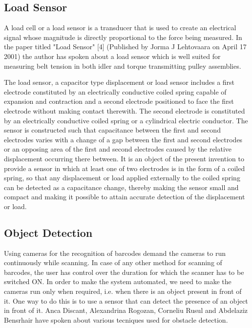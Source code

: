 \documentclass[times, 1pt, a4paper]{article}
\begin{document}
\subsection{Load Sensor} \label{subsection:load_sensor}

A load cell or a load sensor is a transducer that is used to create an electrical signal whose magnitude is directly proportional to the force being measured. In the paper titled "Load Sensor" [4] (Published by Jorma J Lehtovaara on April 17 2001) the author has spoken about a load sensor which is well suited for measuring belt tension in both idler and torque transmitting pulley assemblies. 

The load sensor, a capacitor type displacement or load sensor includes a first electrode constituted by an electrically conductive coiled spring capable of expansion and contraction and a second electrode positioned to face the first electrode without making contact therewith. The second electrode is constituted by an electrically conductive coiled spring or a cylindrical electric conductor. The sensor is constructed such that capacitance between the first and second electrodes varies with a change of a gap between the first and second electrodes or an opposing area of the first and second electrodes caused by the relative displacement occurring there between.
It is an object of the present invention to provide a sensor in which at least one of two electrodes is in the form of a coiled spring, so that any displacement or load applied externally to the coiled spring can be detected as a capacitance change, thereby making the sensor small and compact and making it possible to attain accurate detection of the displacement or load.

\subsection{Object Detection} \label{subsection:object_detection}

Using cameras for the recognition of barcodes demand the cameras to run continuously while scanning. In case of any other method for scanning of barcodes, the user has control over the duration for which the scanner has to be switched ON. In order to make the system automated, we need to make the cameras run only when required, i.e. when there is an object present in front of it. One way to do this is to use a sensor that can detect the presence of an object in front of it. Anca Discant, Alexandrina Rogozan, Corneliu Rusul and Abdelaziz Bensrhair have spoken about various tecniques used for obstacle detection.
\end{document}

